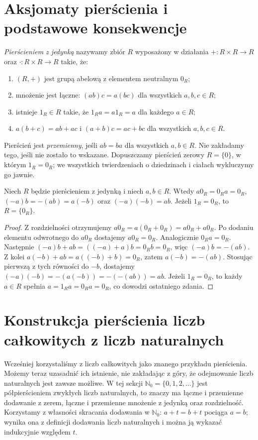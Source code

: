 \section{Aksjomaty pierścienia i podstawowe konsekwencje}
\begin{definicja}
\label{aa:def:pierscien}
\emph{Pierścieniem z jedynką} nazywamy zbiór $R$ wyposażony
w działania $+:R\times R\to R$ oraz $\cdot:R\times R\to R$
takie, że:
\begin{enumerate}[label=\textup{(P\arabic*)}]
\item $(R,+)$ jest grupą abelową z elementem neutralnym $0_R$;
\item mnożenie jest łączne: $(ab)c=a(bc)$ dla wszystkich $a,b,c\in R$;
\item istnieje $1_R\in R$ takie, że $1_Ra=a1_R=a$ dla każdego $a\in R$;
\item $a(b+c)=ab+ac$ i $(a+b)c=ac+bc$ dla wszystkich $a,b,c\in R$.
\end{enumerate}
Pierścień jest \emph{przemienny}, jeśli $ab=ba$ dla wszystkich
$a,b\in R$. Nie zakładamy tego, jeśli nie zostało to wskazane.
Dopuszczamy pierścień zerowy $R=\{0\}$, w którym $1_R=0_R$;
we wszystkich twierdzeniach o dziedzinach i ciałach wykluczymy go jawnie.
\end{definicja}

\begin{lemat}
\label{aa:lem:pierscien-znaki}
Niech $R$ będzie pierścieniem z jedynką i niech $a,b\in R$.
Wtedy $a0_R=0_Ra=0_R$, $(-a)b=-(ab)=a(-b)$ oraz
$(-a)(-b)=ab$. Jeżeli $1_R=0_R$, to $R=\{0_R\}$.
\end{lemat}
\begin{proof}
Z rozdzielności otrzymujemy $a0_R=a(0_R+0_R)=a0_R+a0_R$.
Po dodaniu elementu odwrotnego do $a0_R$ dostajemy $a0_R=0_R$.
Analogicznie $0_Ra=0_R$. Następnie
$(-a)b+ab=((-a)+a)b=0_Rb=0_R$, więc $(-a)b=-(ab)$.
Z kolei $a(-b)+ab=a((-b)+b)=0_R$, zatem $a(-b)=-(ab)$.
Stosując pierwszą z tych równości do $-b$, dostajemy
$(-a)(-b)=-(a(-b))=-(-(ab))=ab$.
Jeżeli $1_R=0_R$, to każdy $a\in R$ spełnia
$a=1_Ra=0_Ra=0_R$, co dowodzi ostatniego zdania.
\end{proof}


\section{Konstrukcja pierścienia liczb całkowitych z liczb naturalnych}
\label{aa:sec:konstrukcja-z}
Wcześniej korzystaliśmy z liczb całkowitych jako znanego przykładu
pierścienia. Możemy teraz uzasadnić ich istnienie, nie zakładając
z góry, że odejmowanie liczb naturalnych jest zawsze możliwe.
W tej sekcji $\mathbb N_0=\{0,1,2,\ldots\}$ jest półpierścieniem
zwykłych liczb naturalnych, to znaczy ma łączne i przemienne dodawanie
z zerem, łączne i przemienne mnożenie z jedynką oraz rozdzielność.
Korzystamy z własności skracania dodawania w $\mathbb N_0$:
$a+t=b+t$ pociąga $a=b$; wynika ona z definicji dodawania
liczb naturalnych i można ją wykazać indukcyjnie względem $t$.

